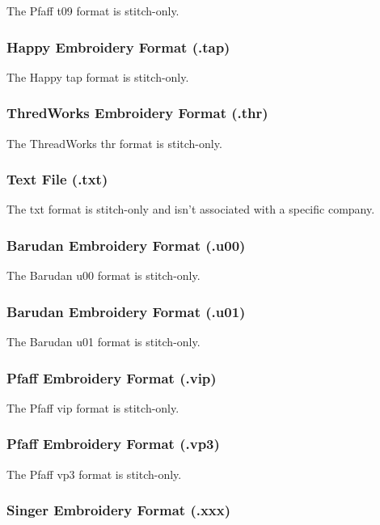 \documentclass[a4paper, 11pt]{report}
\begin{document}
The Pfaff t09 format is stitch-only.

\subsubsection{Happy Embroidery Format (.tap)}

The Happy tap format is stitch-only.

\subsubsection{ThredWorks Embroidery Format (.thr)}

The ThreadWorks thr format is stitch-only.

\subsubsection{Text File (.txt)}

The txt format is stitch-only and isn't associated with a specific company.

\subsubsection{Barudan Embroidery Format (.u00)}

The Barudan u00 format is stitch-only.

\subsubsection{Barudan Embroidery Format (.u01)}

The Barudan u01 format is stitch-only.

\subsubsection{Pfaff Embroidery Format (.vip)}

The Pfaff vip format is stitch-only.

\subsubsection{Pfaff Embroidery Format (.vp3)}

The Pfaff vp3 format is stitch-only.

\subsubsection{Singer Embroidery Format (.xxx)}
\end{document}
